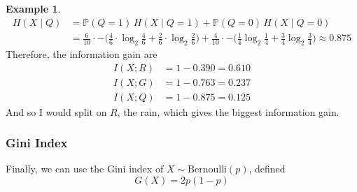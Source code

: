\documentclass{article}
\theoremstyle{definition}
\newtheorem{example}{Example}[section]
\theoremstyle{remark}
\theoremstyle{definition}
\begin{document}
\begin{example}
\begin{align*}
    H(X \mid Q ) & = \mathbb{P}(Q = 1)\, H(X \mid Q = 1) + \mathbb{P}(Q = 0) \, H(X \mid Q = 0) \\
    & = \frac{6}{10} \cdot - \big( \frac{4}{6} \cdot \log_2 \frac{4}{6} + \frac{2}{6} \cdot \log_2 \frac{2}{6} \big) + \frac{4}{10} \cdot - \big( \frac{1}{4} \log_2 \frac{1}{4} + \frac{3}{4} \log_2 \frac{3}{4} \big) \approx 0.875
\end{align*}
Therefore, the information gain are 
\begin{align*}
    I(X; R) & = 1 - 0.390 = 0.610 \\
    I(X; G) & = 1 - 0.763 = 0.237 \\
    I(X; Q) & = 1 - 0.875 = 0.125 
\end{align*}
And so I would split on $R$, the rain, which gives the biggest information gain. 
\end{example}

\subsubsection{Gini Index}

Finally, we can use the Gini index of $X \sim \mathrm{Bernoulli}(p)$, defined 
\[G(X) = 2 p (1 - p)\]
\end{document}
